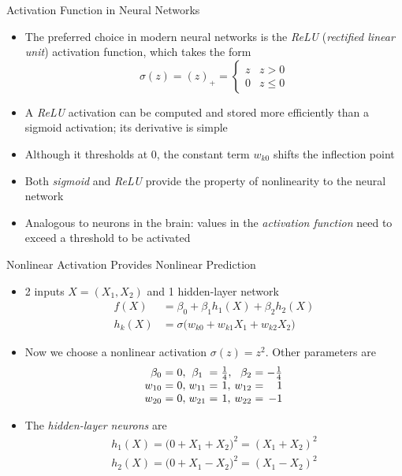 \documentclass[aspectratio=1610,12pt,xcolor=dvipsnames]{beamer}
\begin{document}
\begin{frame}{Activation Function in Neural Networks}
    \begin{itemize}
    \item The preferred choice in modern neural networks is the \textit{ReLU} (\textit{rectified linear unit}) activation function, which takes the form
    \[
    \sigma(z) = (z)_{+} = \begin{cases}
  z & z > 0 \\[6pt]
  0 & z \leq 0
\end{cases}
    \]
    \item A \textit{ReLU} activation can be computed and stored more efficiently than a sigmoid activation; its derivative is simple
    \item Although it thresholds at 0, the constant term $w_{k0}$ shifts the inflection point
    \item Both \textit{sigmoid} and \textit{ReLU} provide the property of nonlinearity to the neural network
    \item Analogous to neurons in the brain: values in the \textit{activation function} need to exceed a threshold to be activated
\end{itemize}
\end{frame}

\begin{frame}{Nonlinear Activation Provides Nonlinear Prediction}

\begin{itemize}
    \item 2 inputs \(X=(X_1,X_2)\) and 1 hidden-layer network
    \begin{align*}
        f(X)&=\beta_0+\beta_1 h_1(X)+\beta_2 h_2(X) \\
        h_k(X)&=\sigma\big(w_{k0}+w_{k1}X_1+w_{k2}X_2\big)
    \end{align*}
    \item Now we choose a nonlinear activation \(\sigma(z)=z^2\). Other parameters are 
        \[
    \setlength{\arraycolsep}{1.5pt}
    \begin{array}{rcrcrcrcr}
      \beta_0 &=& 0, & \beta_1 &=& \frac{1}{4}, & \beta_2 &=& -\frac{1}{4} \\
      w_{10}  &=& 0, & w_{11}  &=& 1,        & w_{12} &=& 1 \\
      w_{20}  &=& 0, & w_{21}  &=& 1,        & w_{22} &=& -1
    \end{array}
    \]
    \item The \textit{hidden-layer neurons} are
    \begin{align*}
        h_1(X)=\big(0+X_1+X_2\big)^2=(X_1+X_2)^2 \\
h_2(X)=\big(0+X_1-X_2\big)^2=(X_1-X_2)^2
    \end{align*}
\end{itemize}
\end{frame}
\end{document}
